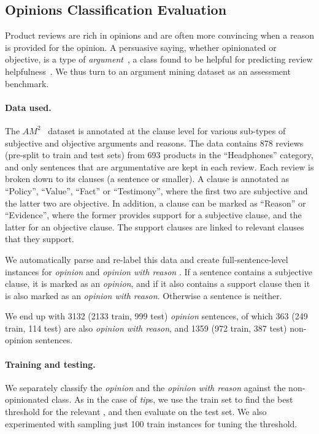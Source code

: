 \subsection{Opinions Classification Evaluation}
\label{sec_appendix_experiments_opinions}
Product reviews are rich in opinions and are often more convincing when a reason is provided for the opinion. 
A persuasive saying, whether opinionated or objective, is a type of \textit{argument}~\citep{ecklekohler2015arguments}, a class found to be helpful for predicting review helpfulness~\citep{liu2017argsForHelpfullness,passon2018helpfulness,chen2022argumentMiningForHelpfulness}. We thus turn to an argument mining dataset as an assessment benchmark.

\paragraph{Data used.}
The $AM^2$~\citep{chen2022argumentMiningForHelpfulness} dataset is annotated at the clause level for various sub-types of subjective and objective arguments and reasons.
The data contains 878 reviews (pre-split to train and test sets) from 693 products in the ``Headphones'' category, and only sentences that are argumentative are kept in each review. Each review is broken down to its clauses (a sentence or smaller). A clause is annotated as ``Policy'', ``Value'', ``Fact'' or ``Testimony'', where the first two are subjective and the latter two are objective. In addition, a clause can be marked as ``Reason'' or ``Evidence'', where the former provides support for a subjective clause, and the latter for an objective clause. The support clauses are linked to relevant clauses that they support.

We automatically parse and re-label this data and create full-sentence-level instances for \textit{opinion} and \textit{opinion with reason} \taxtypes{}. If a sentence contains a subjective clause, it is marked as an \textit{opinion}, and if it also contains a support clause then it is also marked as an \textit{opinion with reason}. Otherwise a sentence is neither.

We end up with 3132 (2133 train, 999 test) \textit{opinion} sentences, of which 363 (249 train, 114 test) are also \textit{opinion with reason}, and 1359 (972 train, 387 test) non-opinion sentences.

\paragraph{Training and testing.}
We separately classify the \textit{opinion} \taxtype{} and the \textit{opinion with reason} \taxtypes{} against the non-opinionated class. As in the case of \textit{tip}s, we use the train set to find the best threshold for the relevant \taxtype{}, and then evaluate on the test set. We also experimented with sampling just 100 train instances for tuning the threshold.


